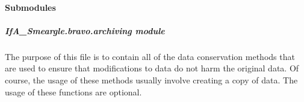 \documentclass[letterpaper,10pt,english]{sphinxmanual}
\begin{document}
\paragraph{Submodules}
\label{\detokenize{python_docstrings/IfA_Smeargle.bravo:submodules}}

\subparagraph{IfA\_Smeargle.bravo.archiving module}
\label{\detokenize{python_docstrings/IfA_Smeargle.bravo.archiving:module-IfA_Smeargle.bravo.archiving}}\label{\detokenize{python_docstrings/IfA_Smeargle.bravo.archiving:ifa-smeargle-bravo-archiving-module}}\label{\detokenize{python_docstrings/IfA_Smeargle.bravo.archiving::doc}}
The purpose of this file is to contain all of the data conservation methods
that are used to ensure that modifications to data do not harm the original
data. Of course, the usage of these methods usually involve creating a
copy of data. The usage of these functions are optional.
\end{document}
